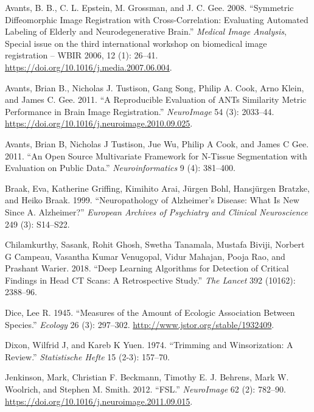 \documentclass[]{elsarticle} %
\newlength{\cslhangindent}
\newenvironment{cslreferences}%
  {\setlength{\parindent}{0pt}%
  \everypar{\setlength{\hangindent}{\cslhangindent}}\ignorespaces}%
  {\par}
\begin{document}
\hypertarget{refs}{}
\begin{cslreferences}
\leavevmode\hypertarget{ref-avants_symmetric_2008}{}%
Avants, B. B., C. L. Epstein, M. Grossman, and J. C. Gee. 2008. ``Symmetric Diffeomorphic Image Registration with Cross-Correlation: Evaluating Automated Labeling of Elderly and Neurodegenerative Brain.'' \emph{Medical Image Analysis}, Special issue on the third international workshop on biomedical image registration -- WBIR 2006, 12 (1): 26--41. \url{https://doi.org/10.1016/j.media.2007.06.004}.

\leavevmode\hypertarget{ref-avants_reproducible_2011}{}%
Avants, Brian B., Nicholas J. Tustison, Gang Song, Philip A. Cook, Arno Klein, and James C. Gee. 2011. ``A Reproducible Evaluation of ANTs Similarity Metric Performance in Brain Image Registration.'' \emph{NeuroImage} 54 (3): 2033--44. \url{https://doi.org/10.1016/j.neuroimage.2010.09.025}.

\leavevmode\hypertarget{ref-atropos}{}%
Avants, Brian B, Nicholas J Tustison, Jue Wu, Philip A Cook, and James C Gee. 2011. ``An Open Source Multivariate Framework for N-Tissue Segmentation with Evaluation on Public Data.'' \emph{Neuroinformatics} 9 (4): 381--400.

\leavevmode\hypertarget{ref-braak1999neuropathology}{}%
Braak, Eva, Katherine Griffing, Kimihito Arai, Jürgen Bohl, Hansjürgen Bratzke, and Heiko Braak. 1999. ``Neuropathology of Alzheimer's Disease: What Is New Since A. Alzheimer?'' \emph{European Archives of Psychiatry and Clinical Neuroscience} 249 (3): S14--S22.

\leavevmode\hypertarget{ref-cq500}{}%
Chilamkurthy, Sasank, Rohit Ghosh, Swetha Tanamala, Mustafa Biviji, Norbert G Campeau, Vasantha Kumar Venugopal, Vidur Mahajan, Pooja Rao, and Prashant Warier. 2018. ``Deep Learning Algorithms for Detection of Critical Findings in Head CT Scans: A Retrospective Study.'' \emph{The Lancet} 392 (10162): 2388--96.

\leavevmode\hypertarget{ref-dice_measures_1945}{}%
Dice, Lee R. 1945. ``Measures of the Amount of Ecologic Association Between Species.'' \emph{Ecology} 26 (3): 297--302. \url{http://www.jstor.org/stable/1932409}.

\leavevmode\hypertarget{ref-dixon1974trimming}{}%
Dixon, Wilfrid J, and Kareb K Yuen. 1974. ``Trimming and Winsorization: A Review.'' \emph{Statistische Hefte} 15 (2-3): 157--70.

\leavevmode\hypertarget{ref-jenkinson_fsl_2012}{}%
Jenkinson, Mark, Christian F. Beckmann, Timothy E. J. Behrens, Mark W. Woolrich, and Stephen M. Smith. 2012. ``FSL.'' \emph{NeuroImage} 62 (2): 782--90. \url{https://doi.org/10.1016/j.neuroimage.2011.09.015}.


\end{cslreferences}
\end{document}
